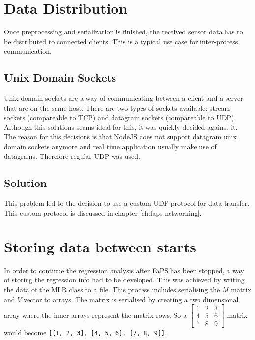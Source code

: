 \section{Data Distribution}

Once preprocessing and serialization is finished, the received sensor data has to be distributed to connected clients. This is a typical use case for inter-process communication.

\subsection{Unix Domain Sockets}

Unix domain sockets are a way of communicating between a client and a server that are on the same host. There are two types of sockets available: stream sockets (compareable to TCP) and datagram sockets (compareable to
UDP). Although this solutions seams ideal for this, it was quickly decided against it. The reason for this decisions is that NodeJS does not support datagram unix domain sockets anymore and real time application usually
make use of datagrams. Therefore regular UDP was used.

\subsection{Solution}

This problem led to the decision to use a custom UDP protocol for data transfer. This custom protocol is discussed in chapter \vref{ch:faps-networking}.

\section{Storing data between starts}

In order to continue the regression analysis after FaPS has been stopped, a way of storing the regression info had to be developed. This was achieved by writing the data of the MLR class to a file. This process includes serialising the $ M $ matrix and $ V $ vector to arrays. The matrix is serialised by creating a two dimensional array where the inner arrays represent the matrix rows. So a $ \begin{bmatrix} 1 & 2 & 3 \\ 4 & 5 & 6 \\ 7 & 8 & 9 \end{bmatrix} $ matrix would become \lstinline{[[1, 2, 3], [4, 5, 6], [7, 8, 9]]}.

